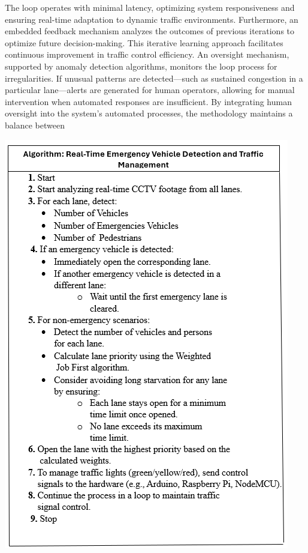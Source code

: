 \documentclass[usenatbib]{tjaa}
\begin{document}
The loop operates with minimal latency, optimizing system responsiveness and ensuring real-time adaptation to dynamic traffic environments. Furthermore, an embedded feedback mechanism analyzes the outcomes of previous iterations to optimize future decision-making. This iterative learning approach facilitates continuous improvement in traffic control efficiency. An oversight mechanism, supported by anomaly detection algorithms, monitors the loop process for irregularities. If unusual patterns are detected—such as sustained congestion in a particular lane—alerts are generated for human operators, allowing for manual intervention when automated responses are insufficient. By integrating human oversight into the system's automated processes, the methodology maintains a balance between
\noindent %
\begin{minipage}{0.5\textwidth}
    \centering
    \includegraphics[width=\textwidth]{10.png} %
\end{minipage}%
\end{document}
